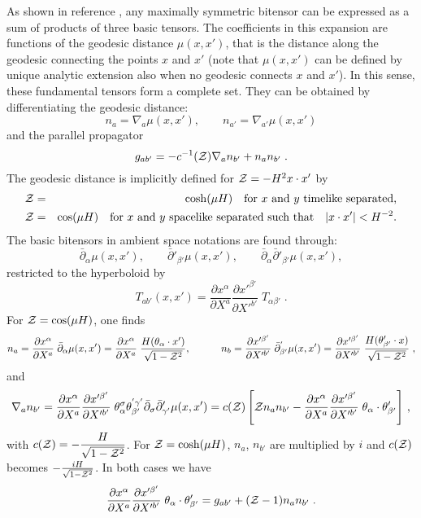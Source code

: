 \documentclass[a4paper,11pt,showpacs,preprintnumbers]{revtex4}
\def\z {{\cal Z}}
\def\bc{\bar\partial_{\alpha}}
\def\bpc{\bar\partial'_{\beta'}}
\def\ab{\frac{\partial x^{\alpha}}{\partial X^a}\frac{\partial x'^{\beta'}}{\partial X'^{b'}}\;}
\def\a{\frac{\partial x^{\alpha}}{\partial X^a}\;}
\def\bb{\frac{\partial x'^{\beta'}}{\partial X'^{b'}}\;}
\begin{document}
\begin{appendix}
As shown in reference \cite{allen}, any maximally symmetric
bitensor can be expressed as a sum of products of three  basic
tensors. The coefficients in this expansion are functions of the
geodesic distance $\mu(x,x')$, that is the distance along the
geodesic connecting the points $x$ and $x'$ (note that $\mu(x,x')$
can be defined by unique analytic extension also when no geodesic
connects $x$ and $x'$). In this sense,  these fundamental tensors
form a complete set.  They can be obtained by differentiating the
geodesic distance:
$$n_{a}=\nabla_{a}\mu(x,x'),\qquad n_{a'}=\nabla_{a'}\mu(x,x')$$
and the parallel propagator
$$ g_{ab'}=-c^{-1}(\z)\nabla_{a} n_{b'}+n_{a}n_{b'}\;.$$
The geodesic distance is implicitly defined \cite{brmo} for
$\z=-H^{2}x\cdot x'$ by
\begin{eqnarray*}
\z&=&\cosh(\mu H)\quad\mbox{for $x$ and $y$ timelike separated,}
\\
 \z&=&\cos(\mu H)\quad\mbox{for $x$ and $y$ spacelike separated such
 that}\quad \vert x\cdot x'\vert <H^{-2}.
\end{eqnarray*}
The basic bitensors  in ambient space notations are found through:
$$\bc\mu(x,x'),\qquad\bpc\mu(x,x'),\qquad \bc\bpc\mu(x,x'),$$
restricted to the hyperboloid by
$$T_{ab'}(x,x')=\ab T_{\alpha\beta'}\;.$$
For $\z=\cos(\mu H)$, one finds
$$n_{a}=\a\bar\partial_{\alpha}\mu(x,x')=\a{{H(\theta_{\alpha}\cdot
x')}\over{\sqrt{1-\z^2}}},\quad\qquad
n_{b}=\bb\bar\partial^{'}_{\beta'}\mu(x,x')=\bb{{H(\theta'_{\beta'}\cdot
x)}\over{\sqrt{1-\z^2}}}\;,$$ and
$$\nabla_{a}n_{b'}=\ab\theta^{\sigma}_{\alpha}\theta^{'\gamma'}_{\beta'}
\bar\partial_{\sigma}\bar\partial'_{\gamma'}\mu(x,x')=c(\z)\left[\z
n_{a}n_{b'}- \ab\theta_{\alpha}\cdot\theta'_{\beta'} \right] \,,$$
with $\displaystyle{c(\z)=-\frac{H}{\sqrt{1-\z^{2}}}}$. For
$\z=\cosh(\mu H)$, $ n_{a}$, $ n_{b'}$   are multiplied by $i$ and
$c(\z)$ becomes $-\frac{iH}{\sqrt{1-\z^{2}}}$. In both cases we
have
$$
\ab\theta_{\alpha}\cdot\theta'_{\beta'}
=g_{ab'}+(\z-1)n_{a}n_{b'}\;.
$$



\end{appendix}
\end{document}
